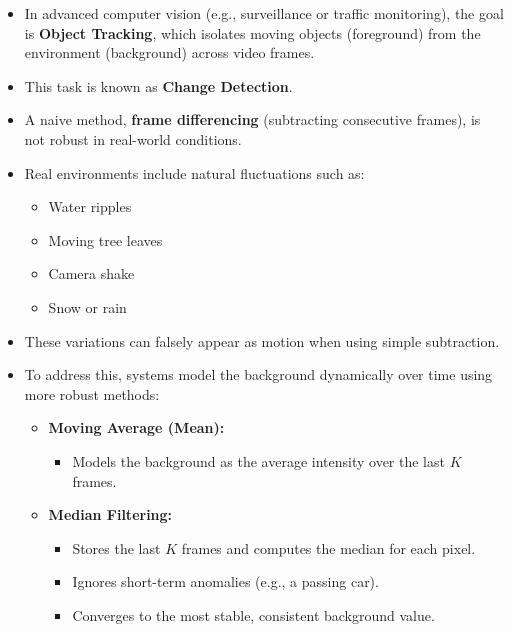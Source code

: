 \documentclass[12pt]{article}
\begin{document}
\begin{itemize}
    \item In advanced computer vision (e.g., surveillance or traffic monitoring), the goal is \textbf{Object Tracking}, which isolates moving objects (foreground) from the environment (background) across video frames.

    \item This task is known as \textbf{Change Detection}.

    \item A naive method, \textbf{frame differencing} (subtracting consecutive frames), is not robust in real-world conditions.

    \item Real environments include natural fluctuations such as:
          \begin{itemize}
              \item Water ripples
              \item Moving tree leaves
              \item Camera shake
              \item Snow or rain
          \end{itemize}

    \item These variations can falsely appear as motion when using simple subtraction.

    \item To address this, systems model the background dynamically over time using more robust methods:

          \begin{itemize}
              \item \textbf{Moving Average (Mean):}
                    \begin{itemize}
                        \item Models the background as the average intensity over the last $K$ frames.
                    \end{itemize}

              \item \textbf{Median Filtering:}
                    \begin{itemize}
                        \item Stores the last $K$ frames and computes the median for each pixel.
                        \item Ignores short-term anomalies (e.g., a passing car).
                        \item Converges to the most stable, consistent background value.
                    \end{itemize}


\end{itemize}
\end{itemize}
\end{document}
